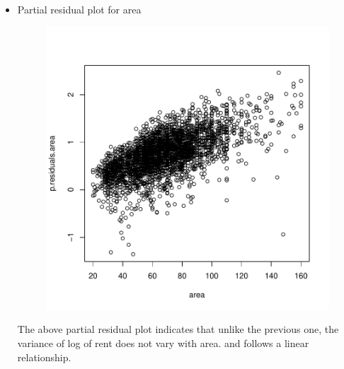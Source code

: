 \documentclass[12pt]{article}
\begin{document}
\begin{itemize}
\item Partial residual plot for area
\begin{figure}[H]
\begin{Schunk}
\end{Schunk}
\includegraphics{HW3-040}
\end{figure}
\clearpage

The above partial residual plot indicates that unlike the previous one, the variance of log of rent does not vary with area. and follows a linear relationship.


\end{itemize}
\end{document}
